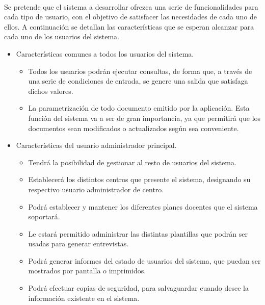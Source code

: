 \paragraph{}Se pretende que el sistema a desarrollar ofrezca una serie de
funcionalidades para cada tipo de usuario, con el objetivo de satisfacer las
necesidades de cada uno de ellos. A continuación se detallan las características
que se esperan alcanzar para cada uno de los usuarios del sistema.


\begin{itemize}
   \item Características comunes a todos los usuarios del sistema.
      \begin{itemize}
         \item Todos los usuarios podrán ejecutar consultas, de forma que, a
         través de una serie de condiciones de entrada, se genere una salida que
         satisfaga dichos valores.
         \item La parametrización de todo documento emitido por la aplicación.
         Esta función del sistema va a ser de gran importancia, ya que permitirá
         que los documentos sean modificados o actualizados según sea
         conveniente.
      \end{itemize}

   \item Características del usuario administrador principal.
      \begin{itemize}
         \item Tendrá la posibilidad de gestionar al resto de usuarios del
               sistema.
         \item Establecerá los distintos centros que presente el sistema,
               designando su respectivo usuario administrador de centro.
         \item Podrá establecer y mantener los diferentes planes docentes que el
               sistema soportará.
         \item Le estará permitido administrar las distintas plantillas
         que podrán ser usadas para generar entrevistas.
         \item Podrá generar informes del estado de usuarios del sistema, que
         puedan ser mostrados por pantalla o imprimidos.
         \item Podrá efectuar copias de seguridad, para salvaguardar cuando
         desee la información existente en el sistema.
      \end{itemize}


\end{itemize}
